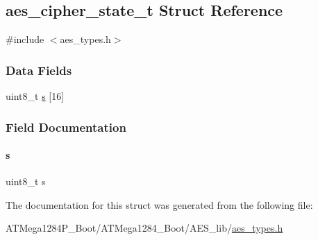\hypertarget{structaes__cipher__state__t}{}\subsection{aes\+\_\+cipher\+\_\+state\+\_\+t Struct Reference}
\label{structaes__cipher__state__t}


{\ttfamily \#include $<$aes\+\_\+types.\+h$>$}

\subsubsection*{Data Fields}
\begin{DoxyCompactItemize}
\item 
uint8\+\_\+t \hyperlink{structaes__cipher__state__t_a80e32cf661e080c3f2712fe3ac15742e}{s} \mbox{[}16\mbox{]}
\end{DoxyCompactItemize}


\subsubsection{Field Documentation}
\mbox{\label{structaes__cipher__state__t_a80e32cf661e080c3f2712fe3ac15742e}} 
\paragraph{\texorpdfstring{s}{s}}
{\footnotesize\ttfamily uint8\+\_\+t s}



The documentation for this struct was generated from the following file\+:\begin{DoxyCompactItemize}
\item 
A\+T\+Mega1284\+P\+\_\+\+Boot/\+A\+T\+Mega1284\+\_\+\+Boot/\+A\+E\+S\+\_\+lib/\hyperlink{_a_t_mega1284_p___boot_2_a_t_mega1284___boot_2_a_e_s__lib_2aes__types_8h}{aes\+\_\+types.\+h}\end{DoxyCompactItemize}
